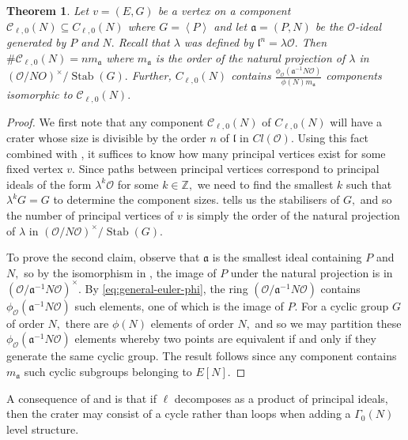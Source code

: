 \documentclass[11pt,a4paper]{amsart}
\theoremstyle{plain}
\newtheorem{thm}{Theorem}[section]
\theoremstyle{definition}
\theoremstyle{remark}
\DeclareMathOperator{\Stab}{Stab}
\begin{document}
\begin{thm}\label{thm:crater-structure-0}
Let $v = (E, G)$ be a vertex on a component $\mathcal{C}_{\ell,0}(N) \subseteq C_{\ell,0}(N)$ where $G = \left\langle P \right\rangle$ and let $\mathfrak{a} = (P, N)$ be the $\mathcal{O}$-ideal generated by $P$ and $N.$ Recall that $\lambda$ was defined by $\mathfrak{l}^n = \lambda \mathcal{O}.$ Then $\#\mathcal{C}_{\ell,0}(N) = nm_{\mathfrak{a}}$ where $m_{\mathfrak{a}}$ is the order of the natural projection of $\lambda$ in $(\mathcal{O}/NO)^{\times}/\Stab(G).$ Further, $C_{\ell,0}(N)$ contains $\frac{\phi_{\mathcal{O}}(\mathfrak{a}^{-1}N \mathcal{O})}{\phi(N)m_{\mathfrak{a}}}$ components isomorphic to $\mathcal{C}_{\ell,0}(N).$
\end{thm}
\begin{proof}
  We first note that any component $\mathcal{C}_{\ell,0}(N)$ of $C_{\ell,0}(N)$ will have a crater whose size is divisible by the order $n$ of $\mathfrak{l}$ in $Cl(\mathcal{O}).$ Using this fact combined with , it suffices to know how many principal vertices exist for some fixed vertex $v.$ Since paths between principal vertices correspond to principal ideals of the form $\lambda^k \mathcal{O}$ for some $k \in \mathbb{Z},$ we need to find the smallest $k$ such that $\lambda^kG = G$ to determine the component sizes.  tells us the stabilisers of $G,$ and so the number of principal vertices of $v$ is simply the order of the natural projection of $\lambda$ in $(\mathcal{O}/N\mathcal{O})^{\times}/\Stab(G).$

  To prove the second claim, observe that $\mathfrak{a}$ is the smallest ideal containing $P$ and $N,$ so by the isomorphism in , the image of $P$ under the natural projection is in $(\mathcal{O}/\mathfrak{a}^{-1}N \mathcal{O})^{\times}$. By \eqref{eq:general-euler-phi}, the ring $(\mathcal{O}/\mathfrak{a}^{-1}N \mathcal{O})$ contains $\phi_{\mathcal{O}}(\mathfrak{a}^{-1}N \mathcal{O})$ such elements, one of which is the image of $P.$ For a cyclic group $G$ of order $N,$ there are $\phi(N)$ elements of order $N,$ and so we may partition these $\phi_{\mathcal{O}}(\mathfrak{a}^{-1}N \mathcal{O})$ elements whereby two points are equivalent if and only if they generate the same cyclic group. The result follows since any component contains $m_{\mathfrak{a}}$ such cyclic subgroups belonging to $E[N].$
\end{proof}
A consequence of  and  is that if $\ell$ decomposes as a product of principal ideals, then the crater may consist of a cycle rather than loops when adding a $\Gamma_{0}(N)$ level structure.
\end{document}
